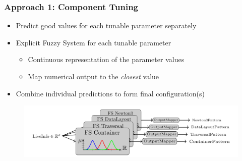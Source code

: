 \documentclass[
	10pt,
	t		%
]{beamer}
\begin{document}
\begin{frame}
	\frametitle{Approach 1: Component Tuning}
	\begin{itemize}
		\item Predict good values for each tunable parameter separately
		\item Explicit Fuzzy System for each tunable parameter
		      \begin{itemize}
			      \item Continuous representation of the parameter values
			      \item Map numerical output to the \textit{closest} value
		      \end{itemize}
		\item Combine individual predictions to form final configuration(s)
	\end{itemize}
	
	\begin{figure}
		\centering
		\includegraphics[width=1\textwidth]{figures/component-approach.png}
	\end{figure}
	
\end{frame}
\end{document}
